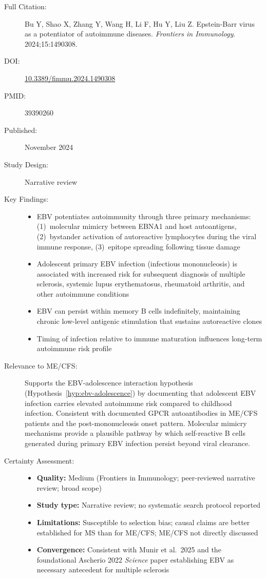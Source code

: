 \begin{description}
    \item[Full Citation:] Bu Y, Shao X, Zhang Y, Wang H, Li F, Hu Y, Liu Z. Epstein-Barr virus as a potentiator of autoimmune diseases. \textit{Frontiers in Immunology}. 2024;15:1490308.
    \item[DOI:] \href{https://doi.org/10.3389/fimmu.2024.1490308}{10.3389/fimmu.2024.1490308}
    \item[PMID:] 39390260
    \item[Published:] November 2024
    \item[Study Design:] Narrative review
    \item[Key Findings:]
    \begin{itemize}
        \item EBV potentiates autoimmunity through three primary mechanisms: (1)~molecular mimicry between EBNA1 and host autoantigens, (2)~bystander activation of autoreactive lymphocytes during the viral immune response, (3)~epitope spreading following tissue damage
        \item Adolescent primary EBV infection (infectious mononucleosis) is associated with increased risk for subsequent diagnosis of multiple sclerosis, systemic lupus erythematosus, rheumatoid arthritis, and other autoimmune conditions
        \item EBV can persist within memory B cells indefinitely, maintaining chronic low-level antigenic stimulation that sustains autoreactive clones
        \item Timing of infection relative to immune maturation influences long-term autoimmune risk profile
    \end{itemize}
    \item[Relevance to ME/CFS:] Supports the EBV-adolescence interaction hypothesis (Hypothesis~\ref{hyp:ebv-adolescence}) by documenting that adolescent EBV infection carries elevated autoimmune risk compared to childhood infection. Consistent with documented GPCR autoantibodies in ME/CFS patients and the post-mononucleosis onset pattern. Molecular mimicry mechanisms provide a plausible pathway by which self-reactive B cells generated during primary EBV infection persist beyond viral clearance.
    \item[Certainty Assessment:]
    \begin{itemize}
        \item \textbf{Quality:} Medium (Frontiers in Immunology; peer-reviewed narrative review; broad scope)
        \item \textbf{Study type:} Narrative review; no systematic search protocol reported
        \item \textbf{Limitations:} Susceptible to selection bias; causal claims are better established for MS than for ME/CFS; ME/CFS not directly discussed
        \item \textbf{Convergence:} Consistent with Munir et al.\ 2025 and the foundational Ascherio 2022 \textit{Science} paper establishing EBV as necessary antecedent for multiple sclerosis
    \end{itemize}
\end{description}


